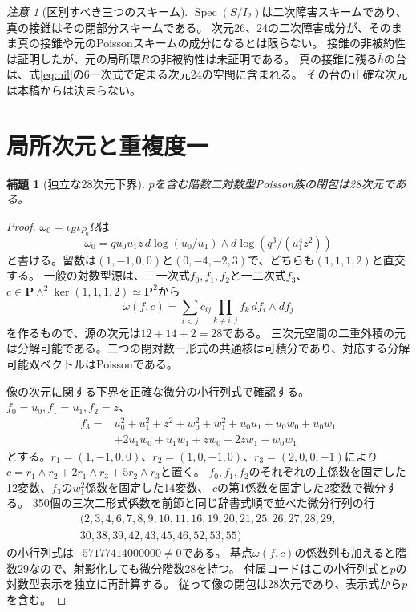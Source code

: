 \documentclass[a4paper,11pt]{ltjsarticle}
\newtheorem{lemma}[theorem]{補題}
\theoremstyle{remark}\newtheorem{remark}[theorem]{注意}
\newcommand{\PP}{\mathbf P}\newcommand{\CC}{\mathbf C}\newcommand{\QQ}{\mathbf Q}
\newcommand{\Spec}{\operatorname{Spec}}\newcommand{\rank}{\operatorname{rank}}
\begin{document}
\begin{remark}[区別すべき三つのスキーム]
$\Spec(S/I_2)$は二次障害スキームであり、真の接錐はその閉部分スキームである。
次元26、24の二次障害成分が、そのまま真の接錐や元のPoissonスキームの成分になるとは限らない。
接錐の非被約性は証明したが、元の局所環$R$の非被約性は未証明である。
真の接錐に残る$\bar h$の台は、式\eqref{eq:nil}の6一次式で定まる次元24の空間に含まれる。
その台の正確な次元は本稿からは決まらない。
\end{remark}

\section{局所次元と重複度一}
\begin{lemma}[独立な28次元下界]\label{lem:lower}
$p$を含む階数二対数型Poisson族の閉包は28次元である。
\end{lemma}
\begin{proof}
$\omega_0=\iota_E\iota_{P_0}\Omega$は
\[
 \omega_0=qu_0u_1z\,d\log(u_0/u_1)\wedge d\log(q^3/(u_1^4z^2))
\]
と書ける。留数は$(1,-1,0,0)$と$(0,-4,-2,3)$で、どちらも$(1,1,1,2)$と直交する。
一般の対数型源は、三一次式$f_0,f_1,f_2$と一二次式$f_3$、
$c\in\PP\wedge^2\ker(1,1,1,2)\simeq\PP^2$から
\[
 \omega(f,c)=\sum_{i<j}c_{ij}\prod_{k\ne i,j}f_k\,df_i\wedge df_j
\]
を作るもので、源の次元は$12+14+2=28$である。
三次元空間の二重外積の元は分解可能である。二つの閉対数一形式の共通核は可積分であり、対応する分解可能双ベクトルはPoissonである。

像の次元に関する下界を正確な微分の小行列式で確認する。
$f_0=u_0,f_1=u_1,f_2=z$、
\[
\begin{split}
f_3={}&u_0^2+u_1^2+z^2+w_0^2+w_1^2+u_0u_1+u_0w_0+u_0w_1\\
     &+2u_1w_0+u_1w_1+zw_0+2zw_1+w_0w_1
\end{split}
\]
とする。$r_1=(1,-1,0,0)$、$r_2=(1,0,-1,0)$、$r_3=(2,0,0,-1)$により
$c=r_1\wedge r_2+2r_1\wedge r_3+5r_2\wedge r_3$と置く。
$f_0,f_1,f_2$のそれぞれの主係数を固定した12変数、$f_3$の$w_1^2$係数を固定した14変数、
$c$の第1係数を固定した2変数で微分する。
350個の三次二形式係数を前節と同じ辞書式順で並べた微分行列の行
\[
\begin{split}
(2,3,4,6,7,8,9,10,11,16,19,20,21,25,26,27,28,29,\\
30,38,39,42,43,45,46,52,53,55)
\end{split}
\]
の小行列式は$-57177414000000\ne0$である。
基点$\omega(f,c)$の係数列も加えると階数29なので、射影化しても微分階数28を持つ。
付属コードはこの小行列式と$p$の対数型表示を独立に再計算する。
従って像の閉包は28次元であり、表示式から$p$を含む。
\end{proof}
\end{document}
